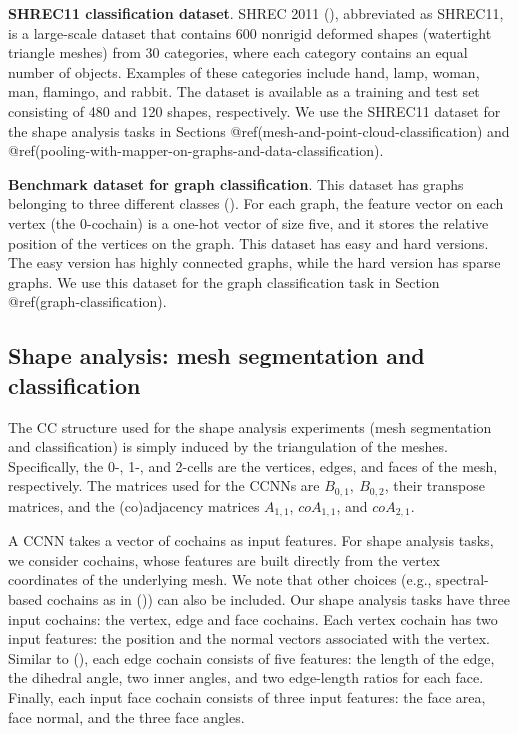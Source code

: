 \documentclass[
  12pt,
]{krantz}
\begin{document}
\textbf{SHREC11 classification dataset}. SHREC 2011
(), abbreviated as
SHREC11, is a large-scale dataset that contains 600 nonrigid deformed
shapes (watertight triangle meshes) from 30 categories, where each
category contains an equal number of objects. Examples of these
categories include hand, lamp, woman, man, flamingo, and rabbit. The
dataset is available as a training and test set consisting of 480 and
120 shapes, respectively. We use the SHREC11 dataset for the shape
analysis tasks in Sections @ref(mesh-and-point-cloud-classification) and
@ref(pooling-with-mapper-on-graphs-and-data-classification).

\textbf{Benchmark dataset for graph classification}. This dataset has
graphs belonging to three different classes
(). For each graph, the feature vector on each vertex (the
0-cochain) is a one-hot vector of size five, and it stores the relative
position of the vertices on the graph. This dataset has easy and hard
versions. The easy version has highly connected graphs, while the hard
version has sparse graphs. We use this dataset for the graph
classification task in Section @ref(graph-classification).

\subsection{Shape analysis: mesh segmentation and
classification}\label{shape-analysis-mesh-segmentation-and-classification}

The CC structure used for the shape analysis experiments (mesh
segmentation and classification) is simply induced by the triangulation
of the meshes. Specifically, the 0-, 1-, and 2-cells are the vertices,
edges, and faces of the mesh, respectively. The matrices used for the
CCNNs are \(B_{0,1},~B_{0,2}\), their transpose matrices, and the
(co)adjacency matrices \(A_{1,1}\), \(coA_{1,1}\), and \(coA_{2,1}\).

A CCNN takes a vector of cochains as input features. For shape analysis
tasks, we consider cochains, whose features are built directly from the
vertex coordinates of the underlying mesh. We note that other choices
(e.g., spectral-based cochains as in
()) can also be included. Our shape analysis tasks have three input
cochains: the vertex, edge and face cochains. Each vertex cochain has
two input features: the position and the normal vectors associated with
the vertex. Similar to (), each edge cochain consists of five features: the length of the
edge, the dihedral angle, two inner angles, and two edge-length ratios
for each face. Finally, each input face cochain consists of three input
features: the face area, face normal, and the three face angles.
\end{document}
